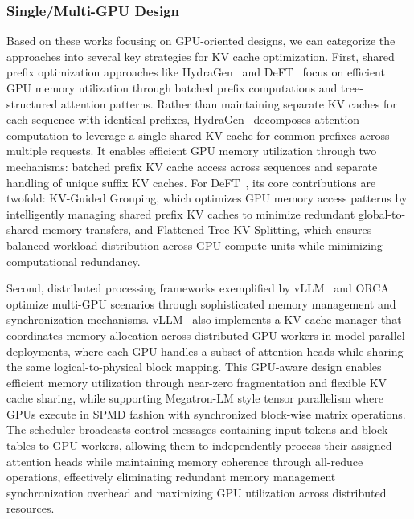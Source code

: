 \subsubsection{Single/Multi-GPU Design}\label{sec:sys_hd_gpu}
Based on these works focusing on GPU-oriented designs, we can categorize the approaches into several key strategies for KV cache optimization. First, shared prefix optimization approaches like HydraGen~\cite{juravsky2024hydragenhighthroughputllminference} and DeFT~\cite{yao2024deftdecodingflashtreeattention} focus on efficient GPU memory utilization through batched prefix computations and tree-structured attention patterns. 
Rather than maintaining separate KV caches for each sequence with identical prefixes, HydraGen~\cite{juravsky2024hydragenhighthroughputllminference} decomposes attention computation to leverage a single shared KV cache for common prefixes across multiple requests. It enables efficient GPU memory utilization through two mechanisms: batched prefix KV cache access across sequences and separate handling of unique suffix KV caches. 
For DeFT~\cite{yao2024deftdecodingflashtreeattention}, its core contributions are twofold: KV-Guided Grouping, which optimizes GPU memory access patterns by intelligently managing shared prefix KV caches to minimize redundant global-to-shared memory transfers, and Flattened Tree KV Splitting, which ensures balanced workload distribution across GPU compute units while minimizing computational redundancy. 


Second, distributed processing frameworks exemplified by vLLM~\cite{DBLP:conf/sosp/KwonLZ0ZY0ZS23} and ORCA~\cite{DBLP:conf/osdi/YuJKKC22} optimize multi-GPU scenarios through sophisticated memory management and synchronization mechanisms. 
vLLM~\cite{DBLP:conf/sosp/KwonLZ0ZY0ZS23} also implements a KV cache manager that coordinates memory allocation across distributed GPU workers in model-parallel deployments, where each GPU handles a subset of attention heads while sharing the same logical-to-physical block mapping. This GPU-aware design enables efficient memory utilization through near-zero fragmentation and flexible KV cache sharing, while supporting Megatron-LM style tensor parallelism where GPUs execute in SPMD fashion with synchronized block-wise matrix operations. The scheduler broadcasts control messages containing input tokens and block tables to GPU workers, allowing them to independently process their assigned attention heads while maintaining memory coherence through all-reduce operations, effectively eliminating redundant memory management synchronization overhead and maximizing GPU utilization across distributed resources.

